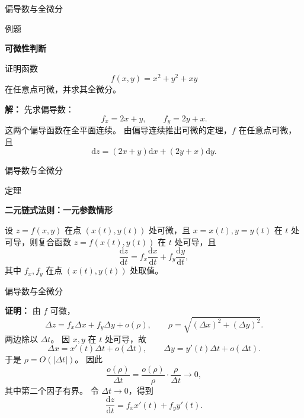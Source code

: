 \documentclass[aspectratio=169,10pt,fontset=fandol]{ctexbeamer}
\newcommand{\dd}{\mathrm{d}}
\begin{document}
\begin{frame}[t,fragile]{偏导数与全微分}
\normalsize
\begin{block}{例题}
{\normalsize
\textbf{可微性判断}\par

证明函数
\[
f(x,y)=x^2+y^2+xy
\]
在任意点可微，并求其全微分。

}
\end{block}
\pause
{\normalsize
\textbf{解：}
先求偏导数：
\[
f_x=2x+y,\qquad f_y=2y+x.
\]
这两个偏导函数在全平面连续。 由偏导连续推出可微的定理，$f$ 在任意点可微，且
\[
\dd z=(2x+y)\dd x+(2y+x)\dd y.
\]

}
\end{frame}
\begin{frame}[t,fragile]{偏导数与全微分}
\footnotesize
\begin{block}{定理}
{\footnotesize
\textbf{二元链式法则：一元参数情形}\par

设 $z=f(x,y)$ 在点 $(x(t),y(t))$ 处可微，且 $x=x(t),y=y(t)$ 在 $t$ 处可导，则复合函数 $z=f(x(t),y(t))$ 在 $t$ 处可导，且
\[
\frac{\dd z}{\dd t}=f_x\frac{\dd x}{\dd t}+f_y\frac{\dd y}{\dd t},
\]
其中 $f_x,f_y$ 在点 $(x(t),y(t))$ 处取值。

}
\end{block}
\end{frame}
\begin{frame}[t,fragile]{偏导数与全微分}
\footnotesize
{\footnotesize
\textbf{证明：}
由 $f$ 可微，
\[
\Delta z=f_x\Delta x+f_y\Delta y+o(\rho),
\qquad \rho=\sqrt{(\Delta x)^2+(\Delta y)^2}.
\]
两边除以 $\Delta t$。 因 $x,y$ 在 $t$ 处可导，故
\[
\Delta x=x'(t)\Delta t+o(\Delta t),\qquad
\Delta y=y'(t)\Delta t+o(\Delta t).
\]
于是 $\rho=O(|\Delta t|)$。 因此
\[
\frac{o(\rho)}{\Delta t}
=\frac{o(\rho)}{\rho}\cdot\frac{\rho}{\Delta t}\to0,
\]
其中第二个因子有界。 令 $\Delta t\to0$，得到
\[
\frac{\dd z}{\dd t}=f_x x'(t)+f_y y'(t).
\]

}
\end{frame}
\end{document}
